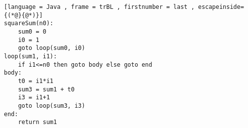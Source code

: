 \begin{lstlisting}[language = Java , frame = trBL , firstnumber = last , escapeinside={(*@}{@*)}]
squareSum(n0):
    sum0 = 0
    i0 = 1
    goto loop(sum0, i0)
loop(sum1, i1):
    if i1<=n0 then goto body else goto end
body:
    t0 = i1*i1
    sum3 = sum1 + t0
    i3 = i1+1
    goto loop(sum3, i3)
end:
    return sum1
\end{lstlisting}
